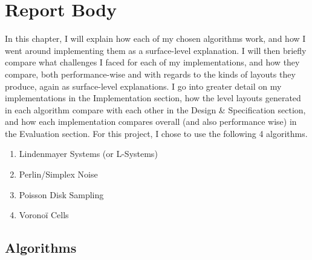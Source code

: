 \chapter{Report Body}

In this chapter, I will explain how each of my chosen algorithms work, and how I went around implementing them as a surface-level explanation. I will then briefly compare what challenges I faced for each of my implementations, and how they compare, both performance-wise and with regards to the kinds of layouts they produce, again as surface-level explanations. I go into greater detail on my implementations in the Implementation section, how the level layouts generated in each algorithm compare with each other in the Design \& Specification section, and how each implementation compares overall (and also performance wise) in the Evaluation section. For this project, I chose to use the following 4 algorithms.

\begin{enumerate}
    \item Lindenmayer Systems (or L-Systems)
    \item Perlin/Simplex Noise
    \item Poisson Disk Sampling
    \item Voronoï Cells
\end{enumerate}

\section{Algorithms}

